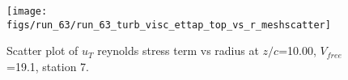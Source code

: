\begin{figure}[H]
\centering
\texttt{[image: figs/run\_63/run\_63\_turb\_visc\_ettap\_top\_vs\_r\_meshscatter]}
\caption{Scatter plot of $
u_T$ reynolds stress term vs radius at $z/c$=10.00, $V_{free}$=19.1, station 7.}
\end{figure}


